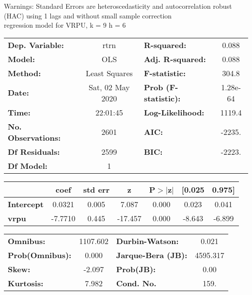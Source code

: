 Warnings: \newline
 [1] Standard Errors are heteroscedasticity and autocorrelation robust (HAC) using 1 lags and without small sample correction\\ 

regression model for VRPU, k = 9 h = 6\begin{center}
\begin{tabular}{lclc}
\toprule
\textbf{Dep. Variable:}    &       rtrn       & \textbf{  R-squared:         } &     0.088   \\
\textbf{Model:}            &       OLS        & \textbf{  Adj. R-squared:    } &     0.088   \\
\textbf{Method:}           &  Least Squares   & \textbf{  F-statistic:       } &     304.8   \\
\textbf{Date:}             & Sat, 02 May 2020 & \textbf{  Prob (F-statistic):} &  1.28e-64   \\
\textbf{Time:}             &     22:01:45     & \textbf{  Log-Likelihood:    } &    1119.4   \\
\textbf{No. Observations:} &        2601      & \textbf{  AIC:               } &    -2235.   \\
\textbf{Df Residuals:}     &        2599      & \textbf{  BIC:               } &    -2223.   \\
\textbf{Df Model:}         &           1      & \textbf{                     } &             \\
\bottomrule
\end{tabular}
\begin{tabular}{lcccccc}
                   & \textbf{coef} & \textbf{std err} & \textbf{z} & \textbf{P$> |$z$|$} & \textbf{[0.025} & \textbf{0.975]}  \\
\midrule
\textbf{Intercept} &       0.0321  &        0.005     &     7.087  &         0.000        &        0.023    &        0.041     \\
\textbf{vrpu}      &      -7.7710  &        0.445     &   -17.457  &         0.000        &       -8.643    &       -6.899     \\
\bottomrule
\end{tabular}
\begin{tabular}{lclc}
\textbf{Omnibus:}       & 1107.602 & \textbf{  Durbin-Watson:     } &    0.021  \\
\textbf{Prob(Omnibus):} &   0.000  & \textbf{  Jarque-Bera (JB):  } & 4595.317  \\
\textbf{Skew:}          &  -2.097  & \textbf{  Prob(JB):          } &     0.00  \\
\textbf{Kurtosis:}      &   7.982  & \textbf{  Cond. No.          } &     159.  \\
\bottomrule
\end{tabular}
\end{center}

